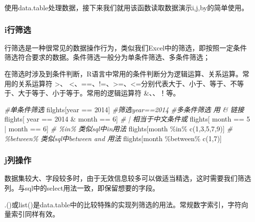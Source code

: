 \documentclass[
]{book}
\newenvironment{Shaded}{\begin{snugshade}}{\end{snugshade}}
\newcommand{\CommentTok}[1]{\textcolor[rgb]{0.56,0.35,0.01}{\textit{#1}}}
\newcommand{\DecValTok}[1]{\textcolor[rgb]{0.00,0.00,0.81}{#1}}
\newcommand{\FunctionTok}[1]{\textcolor[rgb]{0.00,0.00,0.00}{#1}}
\newcommand{\NormalTok}[1]{#1}
\newcommand{\SpecialCharTok}[1]{\textcolor[rgb]{0.00,0.00,0.00}{#1}}
\begin{document}
使用data.table处理数据，接下来我们就用该函数读取数据演示i,j,by的简单使用。

\hypertarget{iux884cux7b5bux9009}{%
\subsubsection{i行筛选}\label{iux884cux7b5bux9009}}

行筛选是一种很常见的数据操作行为，类似我们Excel中的筛选，即按照一定条件筛选符合要求的数据。条件筛选一般分为单条件筛选、多条件筛选；

在筛选时涉及到条件判断，R语言中常用的条件判断分为逻辑运算、关系运算。常用的关系运算符 \textgreater、 \textless、==、!=、\textgreater=、\textless=分别代表大于、小于、等于、不等于、大于等于、小于等于。常用的逻辑运算符 \&、\textbar、！等。

\begin{Shaded}
\begin{Highlighting}[]
\CommentTok{\#单条件筛选}
\NormalTok{filghts[year }\SpecialCharTok{==} \DecValTok{2014}\NormalTok{] }\CommentTok{\#筛选year==2014}
\CommentTok{\#多条件筛选 用 \& 链接}
\NormalTok{flights[ year }\SpecialCharTok{==} \DecValTok{2014} \SpecialCharTok{\&}\NormalTok{ month }\SpecialCharTok{==} \DecValTok{6}\NormalTok{] }
\CommentTok{\# | 相当于中文条件或 }
\NormalTok{flights[ month }\SpecialCharTok{==} \DecValTok{5} \SpecialCharTok{|}\NormalTok{ month }\SpecialCharTok{==} \DecValTok{6}\NormalTok{] }
\CommentTok{\# \%in\% 类似sql中in用法}
\NormalTok{flights[month }\SpecialCharTok{\%in\%} \FunctionTok{c}\NormalTok{(}\DecValTok{1}\NormalTok{,}\DecValTok{3}\NormalTok{,}\DecValTok{5}\NormalTok{,}\DecValTok{7}\NormalTok{,}\DecValTok{9}\NormalTok{)] }
\CommentTok{\# \%between\% 类似sql中between and 用法}
\NormalTok{flights[month }\SpecialCharTok{\%between\%} \FunctionTok{c}\NormalTok{(}\DecValTok{1}\NormalTok{,}\DecValTok{7}\NormalTok{)]}
\end{Highlighting}
\end{Shaded}

\hypertarget{jux5217ux64cdux4f5c}{%
\subsubsection{j列操作}\label{jux5217ux64cdux4f5c}}

数据集较大、字段较多时，由于无效信息较多可以做适当精选，这时需要我们筛选列。与sql中的select用法一致，即保留想要的字段。

.()或list()是data.table中的比较特殊的实现列筛选的用法。常规数字索引，字符向量索引同样有效。
\end{document}
